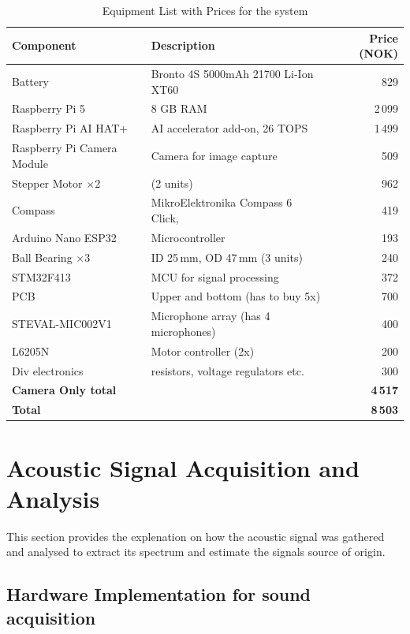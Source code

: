 \begin{table}[h]
\centering
\caption{Equipment List with Prices for the system}
\label{tab:equipment}
\begin{tabular}{|l|l|r|}
\hline
\textbf{Component} & \textbf{Description} & \textbf{Price (NOK)} \\
\hline
Battery & Bronto 4S 5000mAh 21700 Li-Ion XT60 & 829 \\
\hline
Raspberry Pi 5 & 8 GB RAM & 2\,099 \\
\hline
Raspberry Pi AI HAT+ & AI accelerator add-on, 26 TOPS & 1\,499 \\
\hline
Raspberry Pi Camera Module & Camera for image capture & 509 \\
\hline
Stepper Motor $\times$2 & (2 units) & 962 \\
\hline
Compass & MikroElektronika Compass 6 Click, & 419 \\
\hline
Arduino Nano ESP32 & Microcontroller & 193 \\
\hline
Ball Bearing $\times$3 & ID 25\,mm, OD 47\,mm (3 units) & 240 \\
\hline 
STM32F413 & MCU for signal processing & 372 \\ 
\hline
PCB & Upper and bottom (has to buy 5x) & 700 \\ 
\hline
STEVAL-MIC002V1 & Microphone array (has 4 microphones) & 400 \\
\hline
L6205N & Motor controller (2x) & 200\\
\hline
Div electronics & resistors, voltage regulators etc. & 300 \\
\hline
\hline
\textbf{Camera Only total} & & \textbf{4\,517} \\
\hline
\textbf{Total} & & \textbf{8\,503} \\
\hline
\end{tabular}
\end{table}

\section{Acoustic Signal Acquisition and Analysis}
This section provides the explenation on how the acoustic signal was gathered and analysed to extract its spectrum and estimate the signals source of origin.


\subsection{Hardware Implementation for sound acquisition}
